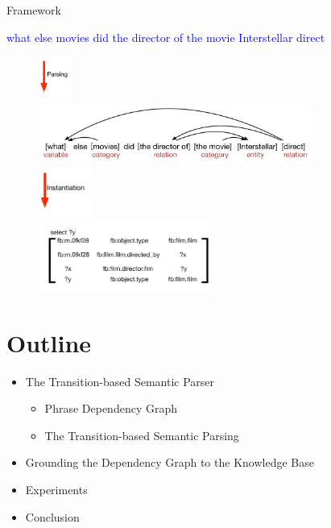 \documentclass{beamer}
\begin{document}
\begin{frame}{Framework}
	\begin{center}
		\textcolor{blue}{what else movies did the director of the movie Interstellar direct}
		\pause
		\begin{figure}
		\centering\includegraphics[width=0.10\textwidth]{introduction/arrow_1.pdf} \\
		\pause
		\centering\includegraphics[width=0.8\textwidth]{introduction/DAG.pdf} \\
		\pause
		\centering\includegraphics[width=0.15\textwidth]{introduction/arrow_2.pdf} \\
		\pause
		\centering\includegraphics[width=0.5\textwidth]{introduction/instantiation.pdf} 
		 \\
		\end{figure}
	\end{center}
\end{frame}

\section{Outline}
\begin{frame}
	\begin{itemize}
		\item The Transition-based Semantic Parser
			\begin{itemize}
				\item Phrase Dependency Graph
				\item The Transition-based Semantic Parsing
			\end{itemize}
		\item Grounding the Dependency Graph to the Knowledge Base
		\item Experiments
		\item Conclusion
	\end{itemize}
\end{frame}
\end{document}
